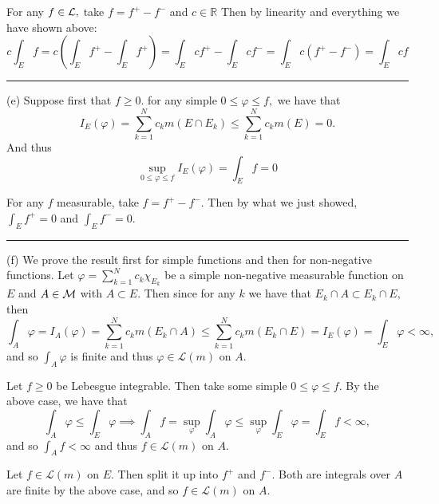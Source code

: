 \documentclass[11pt]{article}
\newcommand{\bbR}{\mathbb{R}}
\begin{document}
\begin{solution}
For any $f \in \cal L,$ take $f = f^+ - f^-$ and $c\in \bbR$ Then by linearity and everything we have shown above:
\[c\int_E f = c(\int_E f^+ - \int_E f^+) = \int_E cf^+ - \int_E cf^- = \int_E c(f^+ - f^-) = \int_E cf\]

\rule{\linewidth}{0.4pt}

(e) Suppose first that $f\geq 0.$ for any simple $0 \leq \varphi \leq f,$ we have that
\[I_E(\varphi) = \sum_{k=1}^{N}c_k m(E \cap E_k) \leq \sum_{k=1}^{N}c_k m(E) = 0.\] And thus 
\[\sup_{0 \leq \varphi\leq f}I_E(\varphi) = \int_E f = 0\]

For any $f$ measurable, take $f = f^+ - f^-.$ Then by what we just showed, $\int_E f^+ = 0$ and $\int_E f^- = 0.$

\rule{\linewidth}{0.4pt}

(f) We prove the result first for simple functions and then for non-negative functions. Let $\varphi = \sum_{k=1}^N c_k \chi_{E_k}$ be a simple non-negative measurable function on $E$ and $A\in \cal M$ with $A\subset E.$ Then since for any $k$ we have that $E_k \cap A \subset E_k \cap E,$ then
\[\int_A \varphi = I_A(\varphi) = \sum_{k=1}^N c_k m(E_k \cap A) \leq \sum_{k=1}^N c_k m(E_k \cap E) = I_E(\varphi) = \int_E \varphi < \infty,\] and so $\int_A \varphi$ is finite and thus $\varphi \in \mathcal{L}(m)$ on $A.$ 

Let $f \geq 0$ be Lebesgue integrable. Then take some simple $0\leq \varphi \leq f.$ By the above case, we have that
\[\int_A \varphi \leq \int_E \varphi \implies \int_A f = \sup_\varphi\int_A \varphi \leq \sup_\varphi\int_E \varphi = \int_E f< \infty,\] and so $\int_A f < \infty$ and thus $f \in \mathcal{L}(m)$ on $A.$

Let $f \in \mathcal{L}(m)$ on $E.$ Then split it up into $f^+$ and $f^-.$ Both are integrals over $A$ are finite by the above case, and so $f \in \mathcal{L}(m)$ on $A.$
\end{solution}

\newpage
\end{document}
